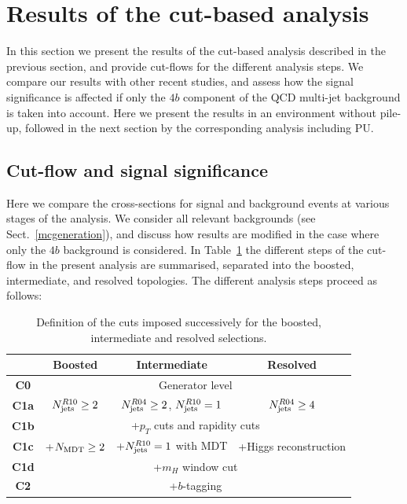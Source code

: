 \section{Results of the cut-based analysis}

\label{sec:results}

In this section we present the results of the 
cut-based analysis described in the previous section, and provide 
cut-flows for the different analysis steps.
%
We
compare our results with other recent studies,
and assess how the signal significance
is affected if only the $4b$ component of the
QCD multi-jet background is taken into account.
%
Here we present the results in an environment without pile-up,
followed in the next section by the corresponding analysis including PU.

\subsection{Cut-flow and signal significance}

Here we compare the cross-sections for
signal and background events at various
stages of the analysis.
%
We consider all relevant backgrounds (see Sect.~\ref{mcgeneration}),
and discuss how results are modified in the case where only the $4b$
background is considered.
%
In Table~\ref{tab:cutflowdetails}
the different
steps of the cut-flow in the present analysis are summarised,
separated into the boosted, intermediate,
    and resolved topologies.
    The different analysis steps proceed as follows:
   

\begin{table}[t]
  \centering
  \begin{tabular}{|c|c|c|c|}
\hline
&  Boosted  &   Intermediate &  Resolved  \\
\hline
\hline
{\bf C0} &  \multicolumn{3}{c|}{Generator level} \\
\hline
{\bf C1a} & $N_{\rm jets}^{R10}\ge 2$ & $N_{\rm jets}^{R04}\ge 2$, $N_{\rm jets}^{R10}=1$  &
$N_{\rm jets}^{R04}\ge 4$ \\
\hline
{\bf  C1b} & \multicolumn{3}{c|}{+$p_T$ cuts and rapidity cuts} \\
\hline
 {\bf C1c} & +$N_{\rm MDT}\ge 2$ & +$N_{\rm jets}^{R10}=1$ with MDT  &
 +Higgs reconstruction \\
 \hline
{\bf C1d} & \multicolumn{3}{c|}{ +$m_H$ window cut} \\
\hline
{\bf C2} & \multicolumn{3}{c|}{+$b$-tagging}    \\
\hline
  \end{tabular}
  \caption{\small Definition of the cuts imposed successively for the boosted, intermediate
    and resolved selections.
      \label{tab:cutflowdetails}
  }
\end{table}


